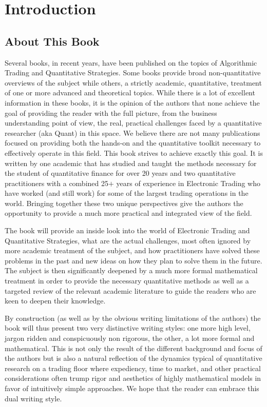 \chapter{Introduction}\label{chap:ch_intro}
\section{About This Book}

Several books, in recent years, have been published  on the topics of Algorithmic Trading and Quantitative Strategies. Some books provide broad non-quantitative overviews of the subject while others, a strictly academic, quantitative, treatment of one or more advanced and theoretical topics. While there is a lot of excellent information in these books, it is the opinion of the authors that none achieve the goal of providing the reader with the full picture, from the business understanding point of view, the real, practical challenges faced by a quantitative researcher (aka Quant) in this space. We believe there are not many publications focused on providing both the hands-on and the quantitative toolkit necessary to effectively operate in this field. This book strives to achieve exactly this goal. It is written by one academic that has studied and taught the methods necessary for the student of quantitative finance for over 20 years and two quantitative practitioners with a combined 25$+$ years of experience in Electronic Trading who have worked (and still work) for some of the largest trading operations in the world. Bringing together these two unique perspectives give the authors the opportunity to provide a much more practical and integrated view of the field.


The book will provide an inside look into the world of Electronic Trading and Quantitative Strategies, what are the actual challenges, most often ignored by more academic treatment of the subject, and how practitioners have solved these problems in the past and new ideas on how they plan to solve them in the future. The subject is then significantly deepened by a much more formal mathematical treatment in order to provide the necessary quantitative methods as well as a targeted review of the relevant academic literature to guide the readers who are keen to deepen their knowledge.


By construction (as well as by the obvious writing limitations of the authors) the book will thus present two very distinctive writing styles: one more high level, jargon ridden and conspicuously non rigorous, the other, a lot more formal and mathematical. This is not only the result of the different background and focus of the authors but is also a natural reflection of the dynamics typical of quantitative research on a trading floor where expediency, time to market, and other practical considerations often trump rigor and aesthetics of highly mathematical models in favor of intuitively simple approaches. We hope that the reader can embrace this dual writing style.\\


